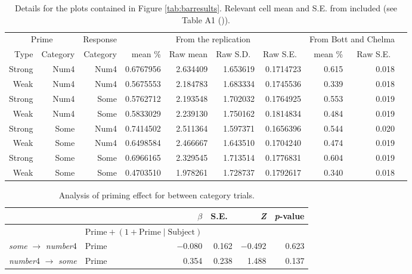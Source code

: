 \documentclass[10pt]{article}
\begin{document}
\begin{table}[h]
  \centering
  \begin{tabular}{rrrrrrrrrr}
    \hline
    \multicolumn{2}{c}{Prime} & Response & \multicolumn{4}{c}{From the replication} & \multicolumn{2}{c}{From Bott and Chelma} \\
    \cline{1-3}
    Type & Category & Category  & mean \% & Raw mean & Raw S.D.\ & Raw S.E.\ &  mean \%  & Raw S.E.\  \\
    \hline
 Strong & Num4 &  Num4 &   0.6767956 &  2.634409 & 1.653619 & 0.1714723  & 0.615 & 0.018   \\
   Weak & Num4 &  Num4 &   0.5675553 &  2.184783 & 1.683334 & 0.1745536  & 0.339 & 0.018    \\
 Strong & Num4 &  Some &   0.5762712 &  2.193548 & 1.702032 & 0.1764925  & 0.553 & 0.019    \\
   Weak & Num4 &  Some &   0.5833029 &  2.239130 & 1.750162 & 0.1814834  & 0.484 & 0.019    \\
 Strong & Some &  Num4 &   0.7414502 &  2.511364 & 1.597371 & 0.1656396  & 0.544 & 0.020    \\
   Weak & Some &  Num4 &   0.6498584 &  2.466667 & 1.643510 & 0.1704240  & 0.474 & 0.019    \\
 Strong & Some &  Some &   0.6966165 &  2.329545 & 1.713514 & 0.1776831  & 0.604 & 0.019    \\
    Weak & Some &  Some &   0.4703510 &  1.978261 & 1.728737 & 0.1792617 & 0.340 & 0.018     \\
    \hline
  \end{tabular}\vspace{-7pt}
  \caption{Details for the plots contained in Figure \ref{tab:barresults}.
  Relevant cell mean and S.E. from \citeauthor{Bott:2016aa} included (see Table A1 (\citeyear[138--139]{Bott:2016aa})).}
\end{table}
\begin{table}[ht]
  \centering
  \begin{tabular}{llrrrr}
    \hline
     & & \(\beta\) & S.E.\ & \emph{Z} & \emph{p}-value  \\
   \hline
    & \multicolumn{2}{l}{\(\text{Prime} + (1 + \text{Prime} \mid \text{Subject})\)} & & & \\
    \emph{some} \(\rightarrow\) \emph{number}4 & Prime & \(-\)0.080 &  0.162 & \(-\)0.492 & 0.623 \\
    \emph{number}4 \(\rightarrow\) \emph{some} & Prime & 0.354  &  0.238 & 1.488  & 0.137 \\
    \hline
  \end{tabular}\vspace{-7pt}
  \caption{Analysis of priming effect for between category trials.}
  \label{tab:primebetweeendirection}
\end{table}
\end{document}

